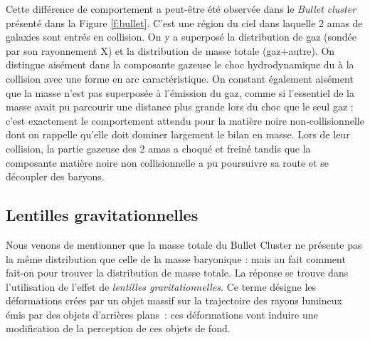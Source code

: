 Cette différence de comportement a peut-être été observée dans le \textit{Bullet cluster} présenté dans la Figure \ref{f:bullet}. C'est une région du ciel dans laquelle 2 amas de galaxies sont entrés en collision. On y a superposé la distribution de gaz (sondée par son rayonnement X) et la distribution de masse totale (gaz+autre). On distingue aisément dans la composante gazeuse le choc hydrodynamique du à la collision avec une forme en arc caractéristique. On constant également aisément que la masse n'est pas superposée à l'émission du gaz, comme si l'essentiel de la masse avait pu parcourir une distance plus grande lors du choc que le seul gaz : c'est exactement le comportement attendu pour la matière noire non-collisionnelle dont on rappelle qu'elle doit dominer largement le bilan en masse. Lors de leur collision, la partie gazeuse des 2 amas a choqué et freiné tandis que la composante matière noire non collisionnelle a pu poursuivre sa route et se découpler des baryons. 

\subsection{Lentilles gravitationnelles}
Nous venons de mentionner que la masse totale du Bullet Cluster ne présente pas la même distribution que celle de la masse baryonique : mais au fait comment fait-on pour trouver la distribution de masse totale. La réponse se trouve dans l'utilisation de l'effet de \textit{lentilles gravitationnelles}. Ce terme désigne les déformations crées par un objet massif sur la trajectoire des rayons lumineux émis par des objets d'arrières plans~: ces déformations vont induire une modification de la perception de ces objets de fond.

